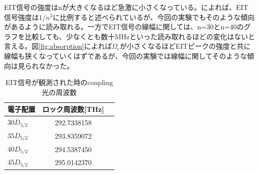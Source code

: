 \documentclass[dvipdfmx]{jsreport}
\begin{document}
EIT信号の強度はnが大きくなるほど急激に小さくなっている。\cite{takase-y}によれば、EIT信号強度は$1/n^3$に比例すると述べられているが、今回の実験でもそのような傾向があるように読み取れる。一方でEIT信号の線幅に関しては、n=30とn=40のグラフを比較しても、少なくとも数十MHzといった読み取れるほどの変化はないと言える。図\ref{fig:absorption}によれば$\Omega_c$が小さくなるほどEITピークの強度と共に線幅も狭くなっていくはずであるが、今回の実験では線幅に関してそのような傾向は見られなかった。
\begin{table}[hbtp]
  \caption{EIT信号が観測された時のcoupling光の周波数}
  \label{table:eit}
  \centering
  \begin{tabular}{lcr}
    \hline
    電子配置  & ロック周波数[THz]  \\
    \hline
    $30D_{5/2}$ & 292.7338158 \\
    $35D_{5/2}$  & 293.8359072 \\
    $40D_{5/2}$  & 294.5387450 \\
    $45D_{5/2}$  & 295.0142370 \\
    \hline
  \end{tabular}
\end{table}
\end{document}
